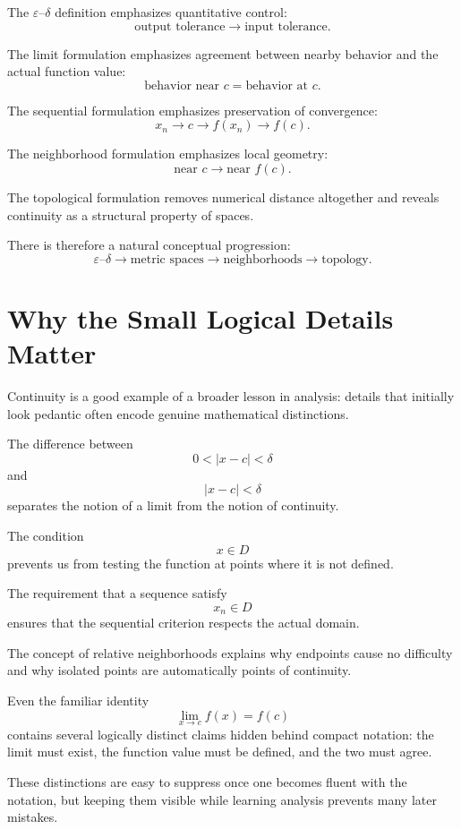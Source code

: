 \documentclass{essay}
\begin{document}
The \(\varepsilon\)--\(\delta\) definition emphasizes quantitative control:
\[ \text{output tolerance} \longrightarrow \text{input tolerance}. \]

The limit formulation emphasizes agreement between nearby behavior and the actual function value:
\[ \text{behavior near }c = \text{behavior at }c. \]

The sequential formulation emphasizes preservation of convergence:
\[ x_{n}\to c \longrightarrow f(x_{n})\to f(c). \]

The neighborhood formulation emphasizes local geometry:
\[ \text{near }c \longrightarrow \text{near }f(c). \]

The topological formulation removes numerical distance altogether and reveals continuity as a structural property of spaces.

There is therefore a natural conceptual progression:
\[ \boxed{ \varepsilon\text{--}\delta \longrightarrow \text{metric spaces} \longrightarrow \text{neighborhoods} \longrightarrow \text{topology}. } \]

\section{Why the Small Logical Details Matter}

Continuity is a good example of a broader lesson in analysis: details that initially look pedantic often encode genuine mathematical distinctions.

The difference between
\[ 0<|x-c|<\delta \]
and
\[ |x-c|<\delta \]
separates the notion of a limit from the notion of continuity.

The condition
\[ x\in D \]
prevents us from testing the function at points where it is not defined.

The requirement that a sequence satisfy
\[ x_{n}\in D \]
ensures that the sequential criterion respects the actual domain.

The concept of relative neighborhoods explains why endpoints cause no difficulty and why isolated points are automatically points of continuity.

Even the familiar identity
\[ \lim_{x\to c}f(x)=f(c) \]
contains several logically distinct claims hidden behind compact notation: the limit must exist, the function value must be defined, and the two must agree.

These distinctions are easy to suppress once one becomes fluent with the notation, but keeping them visible while learning analysis prevents many later mistakes.
\end{document}
